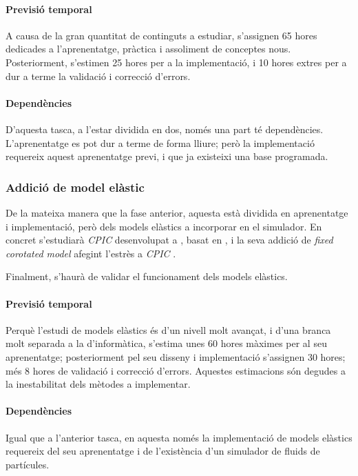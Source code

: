 \documentclass[a4paper]{report}
\begin{document}
	\paragraph{\quad Previsió temporal} A causa de la gran quantitat de continguts a estudiar, s'assignen 65 hores dedicades a l'aprenentatge, pràctica i assoliment de conceptes nous. Posteriorment, s'estimen 25 hores per a la implementació, i 10 hores extres per a dur a terme la validació i correcció d'errors.
	\paragraph{\quad Dependències} D'aquesta tasca, a l'estar dividida en dos, només una part té dependències. L'aprenentatge es pot dur a terme de forma lliure; però la implementació requereix aquest aprenentatge previ, i que ja existeixi una base programada.
	
	\subsubsection{Addició de model elàstic}
	De la mateixa manera que la fase anterior, aquesta està dividida en aprenentatge i implementació, però dels models elàstics a incorporar en el simulador. En concret s'estudiarà \textit{CPIC} desenvolupat a \cite{hu2018mlsmpmcpic}, basat en \cite{Jiang2016}, i la seva addició de \textit{fixed corotated model} afegint l'estrès a \textit{CPIC} \cite{Hu,Jiang2016}. \par
	Finalment, s'haurà de validar el funcionament dels models elàstics.
	\paragraph{\quad Previsió temporal} Perquè l'estudi de models elàstics és d'un nivell molt avançat, i d'una branca molt separada a la d'informàtica, s'estima unes 60 hores màximes per al seu aprenentatge; posteriorment pel seu disseny i implementació s'assignen 30 hores; més 8 hores de validació i correcció d'errors. Aquestes estimacions són degudes a la inestabilitat dels mètodes a implementar.
	\paragraph{\quad Dependències} Igual que a l'anterior tasca, en aquesta només la implementació de models elàstics requereix del seu aprenentatge i de l'existència d'un simulador de fluids de partícules.
	
\end{document}

